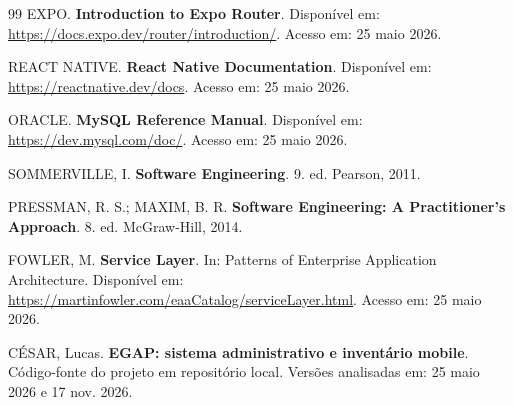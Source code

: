 \documentclass[12pt,a4paper]{article}
\begin{document}
\begin{thebibliography}{99}
EXPO. \textbf{Introduction to Expo Router}. Disponível em: \url{https://docs.expo.dev/router/introduction/}. Acesso em: 25 maio 2026.

REACT NATIVE. \textbf{React Native Documentation}. Disponível em: \url{https://reactnative.dev/docs}. Acesso em: 25 maio 2026.

ORACLE. \textbf{MySQL Reference Manual}. Disponível em: \url{https://dev.mysql.com/doc/}. Acesso em: 25 maio 2026.

SOMMERVILLE, I. \textbf{Software Engineering}. 9. ed. Pearson, 2011.

PRESSMAN, R. S.; MAXIM, B. R. \textbf{Software Engineering: A Practitioner's Approach}. 8. ed. McGraw-Hill, 2014.

FOWLER, M. \textbf{Service Layer}. In: Patterns of Enterprise Application Architecture. Disponível em: \url{https://martinfowler.com/eaaCatalog/serviceLayer.html}. Acesso em: 25 maio 2026.

CÉSAR, Lucas. \textbf{EGAP: sistema administrativo e inventário mobile}. Código-fonte do projeto em repositório local. Versões analisadas em: 25 maio 2026 e 17 nov. 2026.

\end{thebibliography}
\end{document}
